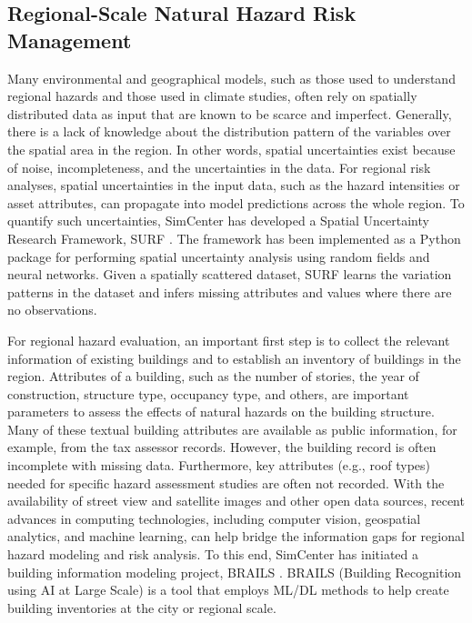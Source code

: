 \subsection{Regional-Scale Natural Hazard Risk Management }

Many environmental and geographical models, such as those used to understand regional hazards and those used in climate studies, often rely on spatially distributed data as input that are known to be scarce and imperfect. Generally, there is a lack of knowledge about the distribution pattern of the variables over the spatial area in the region. In other words, spatial uncertainties exist because of noise, incompleteness, and the uncertainties in the data. For regional risk analyses, spatial uncertainties in the input data, such as the hazard intensities or asset attributes, can propagate into model predictions across the whole region. To quantify such uncertainties, SimCenter has developed a Spatial Uncertainty Research Framework, SURF \citep{wang2019surf}. The framework has been implemented as a Python package for performing spatial uncertainty analysis using random fields and neural networks. Given a spatially scattered dataset, SURF learns the variation patterns in the dataset and infers missing attributes and values where there are no observations. 

For regional hazard evaluation, an important first step is to collect the relevant information of existing buildings and to establish an inventory of buildings in the region. Attributes of a building, such as the number of stories, the year of construction, structure type, occupancy type, and others, are important parameters to assess the effects of natural hazards on the building structure. Many of these textual building attributes are available as public information, for example, from the tax assessor records. However, the building record is often incomplete with missing data. Furthermore, key attributes (e.g., roof types) needed for specific hazard assessment studies are often not recorded. With the availability of street view and satellite images and other open data sources, recent advances in computing technologies, including computer vision, geospatial analytics, and machine learning, can help bridge the information gaps for regional hazard modeling and risk analysis. To this end, SimCenter has initiated a building information modeling project, BRAILS \citep{yu2019building}. BRAILS (Building Recognition using AI at Large Scale) is a tool that employs ML/DL methods to help create building inventories at the city or regional scale.


